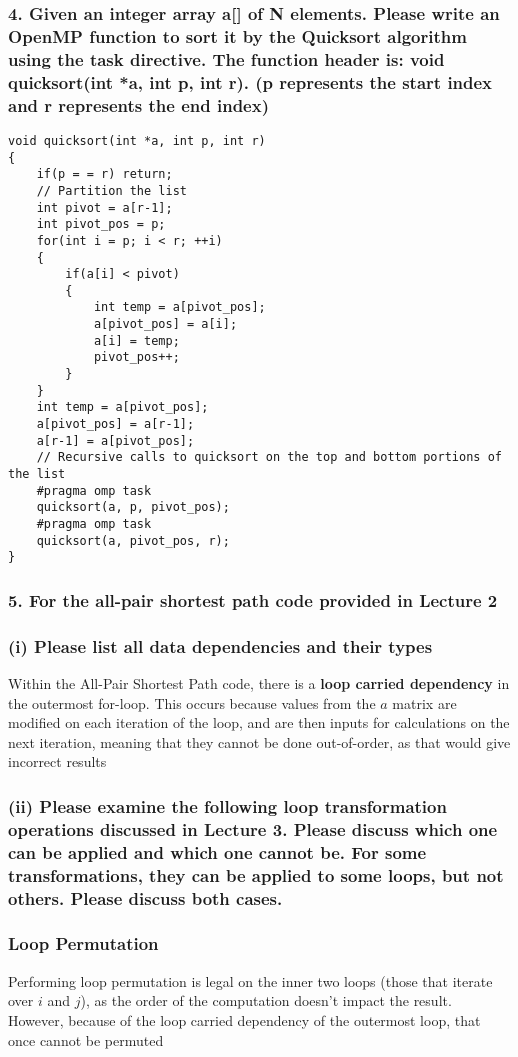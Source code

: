 \documentclass[titlepage]{article}
\begin{document}
\subsubsection*{4. Given an integer array a[] of N elements. Please write an OpenMP function to sort it
by the Quicksort algorithm using the task directive. The function header is: void
quicksort(int *a, int p, int r). (p represents the start index and r
represents the end index)}
\begin{lstlisting}[style=CStyle]
void quicksort(int *a, int p, int r)
{
    if(p = = r) return;
    // Partition the list
    int pivot = a[r-1];
    int pivot_pos = p;
    for(int i = p; i < r; ++i)
    {
        if(a[i] < pivot)
        {
            int temp = a[pivot_pos];
            a[pivot_pos] = a[i];
            a[i] = temp;
            pivot_pos++;
        }
    }
    int temp = a[pivot_pos];
    a[pivot_pos] = a[r-1];
    a[r-1] = a[pivot_pos];
    // Recursive calls to quicksort on the top and bottom portions of the list
    #pragma omp task
    quicksort(a, p, pivot_pos);
    #pragma omp task
    quicksort(a, pivot_pos, r);
}
\end{lstlisting}

\subsubsection*{5. For the all-pair shortest path code provided in Lecture 2}
\subsubsection*{(i) Please list all data dependencies and their types}
Within the All-Pair Shortest Path code, there is a \textbf{loop carried dependency} in the outermost
for-loop. This occurs because values from the $a$ matrix are modified on each iteration of the loop, and
are then inputs for calculations on the next iteration, meaning that they cannot be done out-of-order, as
that would give incorrect results

\subsubsection*{(ii) Please examine the following loop transformation operations discussed in Lecture 3. 
Please discuss which one can be applied and which one cannot be. For some transformations, they can 
be applied to some loops, but not others. Please discuss both cases.}
\subsubsection*{Loop Permutation}
Performing loop permutation is legal on the inner two loops (those that iterate over $i$ and $j$), as the 
order of the computation doesn't impact the result. However, because of the loop carried dependency of the
outermost loop, that once cannot be permuted
\end{document}
